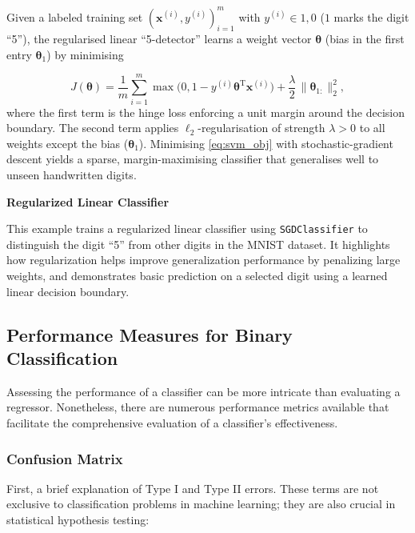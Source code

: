\documentclass[12pt,letter]{article}
\begin{document}
Given a labeled training set ${(\mathbf x^{(i)},y^{(i)})}_{i=1}^m$ with
$y^{(i)}\in{1,0}$ ($1$ marks the digit ``5''), the regularised linear ``5-detector'' learns a weight vector $\boldsymbol{\theta}$ (bias in the first entry $\boldsymbol{\theta}_1$) by minimising

\begin{equation}
\label{eq:svm_obj}
J(\boldsymbol{\theta}) =
\frac{1}{m}\sum_{i=1}^{m}
\max \bigl(0,1-y^{(i)}\boldsymbol{\theta}^{\text{T}}\mathbf x^{(i)}\bigr)
+ \frac{\lambda}{2}\,\bigl\lVert\boldsymbol{\theta}_{1:}\bigr\rVert_2^{2},
\end{equation}
where the first term is the hinge loss enforcing a unit margin around the decision boundary. The second term applies $\ell_2$-regularisation of strength $\lambda>0$ to all weights except the bias ($\boldsymbol{\theta}_{1}$). Minimising \eqref{eq:svm_obj} with stochastic-gradient descent yields a sparse, margin-maximising classifier that generalises well to unseen handwritten digits.



\begin{example}
\textbf{Regularized Linear Classifier}

\noindent This example trains a regularized linear classifier using \texttt{SGDClassifier} to distinguish the digit ``5'' from other digits in the MNIST dataset. It highlights how regularization helps improve generalization performance by penalizing large weights, and demonstrates basic prediction on a selected digit using a learned linear decision boundary.
\end{example}



\subsection{Performance Measures for Binary Classification}

Assessing the performance of a classifier can be more intricate than evaluating a regressor. Nonetheless, there are numerous performance metrics available that facilitate the comprehensive evaluation of a classifier's effectiveness.



\subsubsection{Confusion Matrix}

First, a brief explanation of Type I and Type II errors. These terms are not exclusive to classification problems in machine learning; they are also crucial in statistical hypothesis testing:
\end{document}
